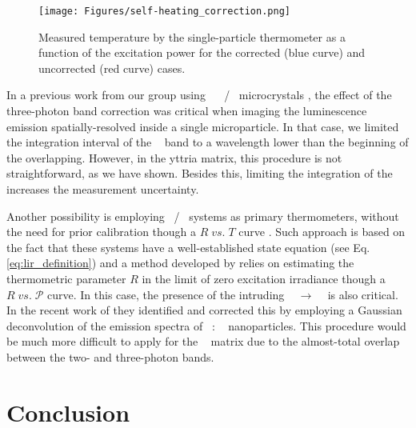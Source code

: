 \documentclass[journal=jacsat,manuscript=article, layout=twocolumn]{achemso}
\newcommand*\Yttria[1]{Y$_{2}$O$_{3}$}
\newcommand*\Fluorite[1]{NaYF$_{4}$}
\newcommand*\Yb[1]{Yb$^{3+}$}
\newcommand*\Er[1]{Er$^{3+}$}
\newcommand*\twoHnine[1]{$^2$H$_{9/2}$}
\newcommand*\fourSthree[1]{$^4$S$_{3/2}$}
\newcommand*\fourIthirteen[1]{$^4$I$_{13/2}$}
\begin{document}
\begin{figure}[h]
\begin{center}
\texttt{[image: Figures/self-heating\_correction.png]}
\caption{Measured temperature by the single-particle thermometer as a function of the excitation power for the corrected (blue curve) and uncorrected (red curve) cases.}%
\label{fig:self_heating}
\end{center}
\end{figure}

In a previous work from our group using \Fluorite~ \Yb~/\Er~ microcrystals \cite{Pessoa_2022}, the effect of the three-photon band correction was critical when imaging the luminescence emission spatially-resolved inside a single microparticle. In that case, we limited the integration interval of the \fourSthree~ band to a wavelength lower than the beginning of the overlapping. However, in the yttria matrix, this procedure is not straightforward, as we have shown. Besides this, limiting the integration of the \fourSthree~ increases the measurement uncertainty. 

Another possibility is employing \Yb~/\Er~ systems as primary thermometers, without the need for prior calibration though a $R \; vs. \; T$ curve \cite{Balabhadra_2017}. Such approach is based on the fact that these systems have a well-established state equation (see Eq. \eqref{eq:lir_definition}) and a method developed by \citeauthor{Balabhadra_2017} \cite{Balabhadra_2017} relies on estimating the thermometric parameter $R$ in the limit of zero excitation irradiance though a $R \; vs. \; \mathcal{P}$ curve. In this case, the presence of the intruding \twoHnine~ $\rightarrow$ \fourIthirteen~ is also critical. In the recent work of \citeauthor{Martins_2021} \cite{Martins_2021} they identified and corrected this by employing a Gaussian deconvolution of the emission spectra of \Fluorite~: \Er~ nanoparticles. This procedure would be much more difficult to apply for the \Yttria~ matrix due to the almost-total overlap between the two- and three-photon bands.

\section{Conclusion}{\label{sec:conclusions}}
\end{document}
